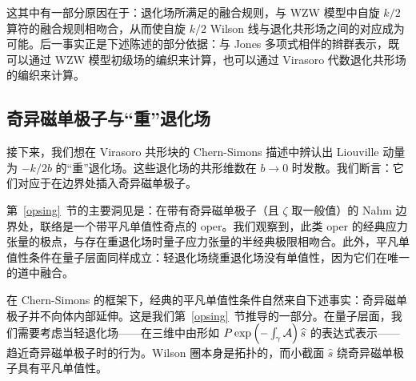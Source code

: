 

这其中有一部分原因在于：退化场所满足的融合规则，与 WZW 模型中自旋 $k/2$ 算符的融合规则相吻合，从而使自旋 $k/2$ Wilson 线与退化共形场之间的对应成为可能。后一事实正是下述陈述的部分依据：与 Jones 多项式相伴的辫群表示，既可以通过 WZW 模型初级场的编织来计算，也可以通过 Virasoro 代数退化共形场的编织来计算。

\subsection{奇异磁单极子与“重”退化场}\label{hdf}
接下来，我们想在 Virasoro 共形块的 Chern-Simons 描述中辨认出 Liouville 动量为 $-k/2b$ 的“重”退化场。这些退化场的共形维数在 $b\to 0$ 时发散。我们断言：它们对应于在边界处插入奇异磁单极子。


第~\ref{opsing}~节的主要洞见是：在带有奇异磁单极子（且 $\zeta$ 取一般值）的 Nahm 边界处，联络是一个带平凡单值性奇点的 oper。我们观察到，此类 oper 的经典应力张量的极点，与存在重退化场时量子应力张量的半经典极限相吻合。此外，平凡单值性条件在量子层面同样成立：轻退化场绕重退化场没有单值性，因为它们在唯一的道中融合。


在 Chern-Simons 的框架下，经典的平凡单值性条件自然来自下述事实：奇异磁单极子并不向体内部延伸。这是我们第~\ref{opsing}~节推导的一部分。在量子层面，我们需要考虑当轻退化场——在三维中由形如 $P\exp\left(-\int_\gamma{\mathcal A}\right) \widehat s$ 的表达式表示——趋近奇异磁单极子时的行为。Wilson 圈本身是拓扑的，而小截面 $\hat s$ 绕奇异磁单极子具有平凡单值性。

